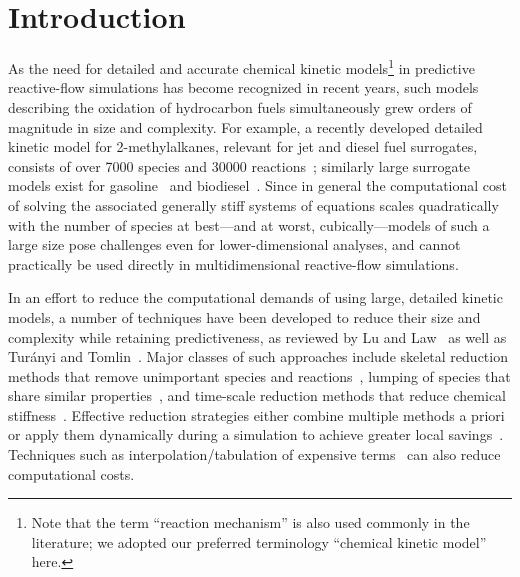 \documentclass[preprint,12pt]{elsarticle}
\begin{document}
\section{Introduction}
\label{sec:intro}

As the need for detailed and accurate chemical kinetic models\footnote{Note that the term ``reaction mechanism'' is also used commonly in the literature; we adopted our preferred terminology ``chemical kinetic model'' here.} in predictive reactive-flow simulations has become recognized in recent years, such models describing the oxidation of hydrocarbon fuels simultaneously grew orders of magnitude in size and complexity.
For example, a recently developed detailed kinetic model for 2-methylalkanes, relevant for jet and diesel fuel surrogates, consists of over 7000 species and 30000 reactions~\cite{Sarathy:2011kx}; similarly large surrogate models exist for gasoline~\cite{Mehl:2011cn,Mehl:2011jn} and biodiesel~\cite{Herbinet:2010gu}.
Since in general the computational cost of solving the associated generally stiff systems of equations scales quadratically with the number of species at best---and at worst, cubically---models of such a large size pose challenges even for lower-dimensional analyses, and cannot practically be used directly in multidimensional reactive-flow simulations.

In an effort to reduce the computational demands of using large, detailed kinetic models, a number of techniques have been developed to reduce their size and complexity while retaining predictiveness, as reviewed by Lu and Law~\cite{Lu:2009gh} as well as Tur{\'a}nyi and Tomlin~\cite{Turanyi:2014aa}.
Major classes of such approaches include skeletal reduction methods that remove unimportant species and reactions~\cite{Lu:2006bb,Pepiot-Desjardins:2008,Hiremath:2010jw,Niemeyer:2010bt}, lumping of species that share similar properties~\cite{Lu:2007,Ahmed:2007fa,Pepiot:2008kq}, and time-scale reduction methods that reduce chemical stiffness~\cite{Maas:1992ws,Lam:1994ws,Lu:2001ve,Gou:2010}.
Effective reduction strategies either combine multiple methods a priori~\cite{Lu:2008bi,Niemeyer:2014,Niemeyer:2015wq} or apply them dynamically during a simulation to achieve greater local savings~\cite{Banerjee:2006,Liang:2009,Shi:2010,Gou:2013eu,Yang:2013ip,Curtis:2015aa}.
Techniques such as interpolation\slash tabulation of expensive terms~\cite{Pope:1997wu} can also reduce computational costs.
\end{document}
